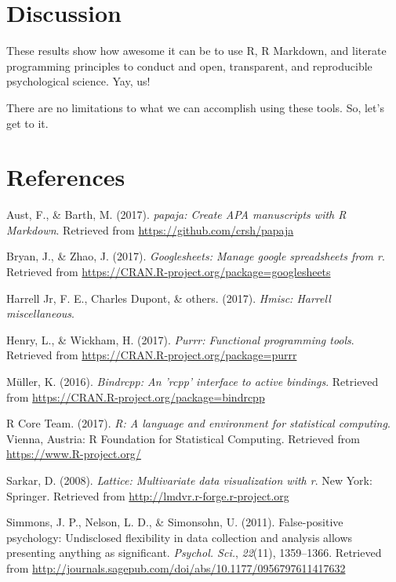 \documentclass[english,man]{apa6}
\theoremstyle{definition}
\theoremstyle{definition}
\theoremstyle{remark}
\begin{document}
\section{Discussion}\label{discussion}

These results show how awesome it can be to use R, R Markdown, and
literate programming principles to conduct and open, transparent, and
reproducible psychological science. Yay, us!

There are no limitations to what we can accomplish using these tools.
So, let's get to it.

\newpage

\section{References}\label{references}

\setlength{\parindent}{-0.5in} \setlength{\leftskip}{0.5in}

\hypertarget{refs}{}
\hypertarget{ref-R-papaja}{}
Aust, F., \& Barth, M. (2017). \emph{papaja: Create APA manuscripts with
R Markdown}. Retrieved from \url{https://github.com/crsh/papaja}

\hypertarget{ref-R-googlesheets}{}
Bryan, J., \& Zhao, J. (2017). \emph{Googlesheets: Manage google
spreadsheets from r}. Retrieved from
\url{https://CRAN.R-project.org/package=googlesheets}

\hypertarget{ref-R-Hmisc}{}
Harrell Jr, F. E., Charles Dupont, \& others. (2017). \emph{Hmisc:
Harrell miscellaneous}.

\hypertarget{ref-R-purrr}{}
Henry, L., \& Wickham, H. (2017). \emph{Purrr: Functional programming
tools}. Retrieved from \url{https://CRAN.R-project.org/package=purrr}

\hypertarget{ref-R-bindrcpp}{}
Müller, K. (2016). \emph{Bindrcpp: An 'rcpp' interface to active
bindings}. Retrieved from
\url{https://CRAN.R-project.org/package=bindrcpp}

\hypertarget{ref-R-base}{}
R Core Team. (2017). \emph{R: A language and environment for statistical
computing}. Vienna, Austria: R Foundation for Statistical Computing.
Retrieved from \url{https://www.R-project.org/}

\hypertarget{ref-R-lattice}{}
Sarkar, D. (2008). \emph{Lattice: Multivariate data visualization with
r}. New York: Springer. Retrieved from
\url{http://lmdvr.r-forge.r-project.org}

\hypertarget{ref-Simmons2011-za}{}
Simmons, J. P., Nelson, L. D., \& Simonsohn, U. (2011). False-positive
psychology: Undisclosed flexibility in data collection and analysis
allows presenting anything as significant. \emph{Psychol. Sci.},
\emph{22}(11), 1359--1366. Retrieved from
\url{http://journals.sagepub.com/doi/abs/10.1177/0956797611417632}
\end{document}
